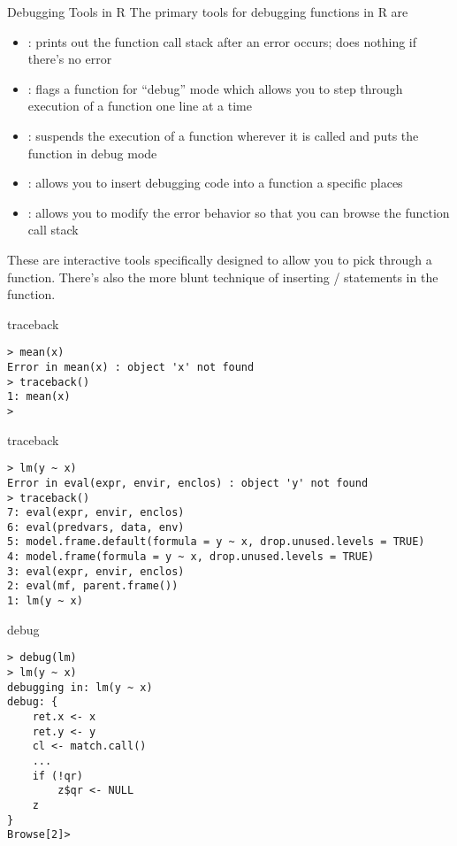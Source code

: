 \documentclass[aspectratio=169]{beamer}
\begin{document}
\begin{frame}{Debugging Tools in R}
The primary tools for debugging functions in R are
\begin{itemize}
\item {}: prints out the function call stack after an
  error occurs; does nothing if there's no error
\item {}: flags a function for ``debug'' mode which allows
  you to step through execution of a function one line at a time
\item {}: suspends the execution of a function wherever it
  is called and puts the function in debug mode 
\item {}: allows you to insert debugging code into a
  function a specific places
\item {}: allows you to modify the error behavior so that
  you can browse the function call stack
\end{itemize}
These are interactive tools specifically designed to allow you to pick
through a function. There's also the more blunt technique of inserting
/ statements in the function.
\end{frame}




\begin{frame}[fragile]{traceback}
\begin{verbatim}
> mean(x)
Error in mean(x) : object 'x' not found
> traceback()
1: mean(x)
> 
\end{verbatim}
\end{frame}

\begin{frame}[fragile]{traceback}
\begin{verbatim}
> lm(y ~ x)
Error in eval(expr, envir, enclos) : object 'y' not found
> traceback()
7: eval(expr, envir, enclos)
6: eval(predvars, data, env)
5: model.frame.default(formula = y ~ x, drop.unused.levels = TRUE)
4: model.frame(formula = y ~ x, drop.unused.levels = TRUE)
3: eval(expr, envir, enclos)
2: eval(mf, parent.frame())
1: lm(y ~ x)
\end{verbatim}
\end{frame}

\begin{frame}[fragile]{debug}
\begin{verbatim}
> debug(lm)
> lm(y ~ x)
debugging in: lm(y ~ x)
debug: {
    ret.x <- x
    ret.y <- y
    cl <- match.call()
    ...
    if (!qr) 
        z$qr <- NULL
    z
}
Browse[2]> 
\end{verbatim}
\end{frame}
\end{document}
